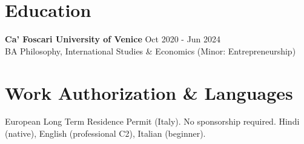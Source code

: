 \documentclass[a4paper,10pt]{article}
\begin{document}
\section{Education}
\textbf{Ca' Foscari University of Venice} \hfill Oct 2020 - Jun 2024\\
BA Philosophy, International Studies \& Economics (Minor: Entrepreneurship)

\section{Work Authorization \& Languages}
European Long Term Residence Permit (Italy). No sponsorship required. Hindi (native), English (professional C2), Italian (beginner).
\end{document}
